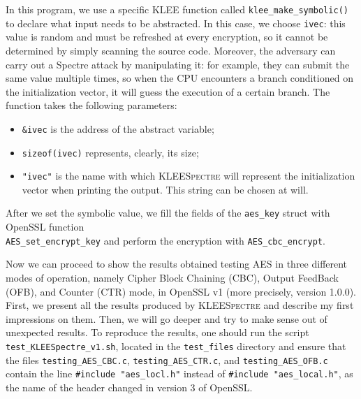 \documentclass[target=mst,aauheader=aics]{thud}
\theoremstyle{definition}
\begin{document}
	In this program, we use a specific \textsc{KLEE} function called \texttt{klee\_make\_symbolic()} to declare what input needs to be abstracted. In this case, we choose \texttt{ivec}: this value is random and must be refreshed at every encryption, so it cannot be determined by simply scanning the source code. Moreover, the adversary can carry out a Spectre attack by manipulating it: for example, they can submit the same value multiple times, so when the CPU encounters a branch conditioned on the initialization vector, it will guess the execution of a certain branch. The function takes the following parameters:
	\begin{itemize}
		\item \texttt{\&ivec} is the address of the abstract variable;
		\item \texttt{sizeof(ivec)} represents, clearly, its size;
		\item \texttt{"ivec"} is the name with which \textsc{KLEESpectre} will represent the initialization vector when printing the output. This string can be chosen at will.
	\end{itemize}
	After we set the symbolic value, we fill the fields of the \texttt{aes\_key} struct with OpenSSL function\\ \texttt{AES\_set\_encrypt\_key} and perform the encryption with \texttt{AES\_cbc\_encrypt}.
	
    Now we can proceed to show the results obtained testing AES in three different modes of operation, namely Cipher Block Chaining (CBC), Output FeedBack (OFB), and Counter (CTR) mode, in OpenSSL v1 (more precisely, version 1.0.0). First, we present all the results produced by \textsc{KLEESpectre} and describe my first impressions on them. Then, we will go deeper and try to make sense out of unexpected results. 
	To reproduce the results, one should run the script \texttt{test\_KLEESpectre\_v1.sh}, located in the \texttt{test\_files} directory and ensure that the files \texttt{testing\_AES\_CBC.c}, \texttt{testing\_AES\_CTR.c}, and \texttt{testing\_AES\_OFB.c} contain the line \texttt{\#include "aes\_locl.h"} instead of \texttt{\#include "aes\_local.h"}, as the name of the header changed in version 3 of OpenSSL.
	
\end{document}
